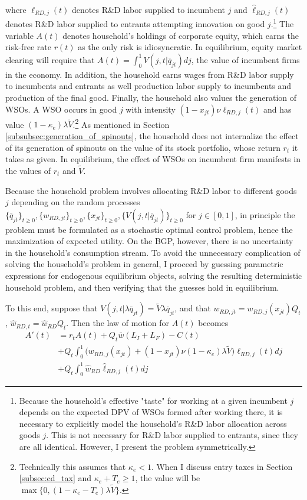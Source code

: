 \documentclass[11pt,english]{article}
\theoremstyle{remark}
\begin{document}
\normalsize


where $\ell_{RD,j}(t)$ denotes R\&D labor supplied to incumbent $j$ and $\hat{\ell}_{RD,j}(t)$ denotes R\&D labor supplied to entrants attempting innovation on good $j$.\footnote{Because the household's effective "taste" for working at a given incumbent $j$ depends on the expected DPV of WSOs formed after working there, it is necessary to explicitly model the household's R\&D labor allocation across goods $j$. This is not necessary for R\&D labor supplied to entrants, since they are all identical. However, I present the problem symmetrically.} The variable $A(t)$ denotes household's holdings of corporate equity, which earns the risk-free rate $r(t)$ as the only risk is idiosyncratic. In equilibrium, equity market clearing will require that $A(t) = \int_0^1 V(j,t|\bar{q}_{jt}) dj$, the value of incumbent firms in the economy. In addition, the household earns wages from R\&D labor supply to incumbents and entrants as well production labor supply to incumbents and production of the final good. Finally, the household also values the generation of WSOs. A WSO occurs in good $j$ with intensity $(1-x_{jt})\nu \ell_{RD,j}(t)$ and has value $(1-\kappa_e)\lambda \tilde{V}$.\footnote{Technically this assumes that $\kappa_e < 1$. When I discuss entry taxes in Section \ref{subsec:cd_tax} and $\kappa_e + T_e \ge 1$, the value will be $\max\{0,(1-\kappa_e - T_e) \lambda \tilde{V} \}$.} As mentioned in Section \ref{subsubsec:generation_of_spinouts}, the household does not internalize the effect of its generation of spinouts on the value of its stock portfolio, whose return $r_t$ it takes as given. In equilibrium, the effect of WSOs on incumbent firm manifests in the values of $r_t$ and $\tilde{V}$. 
	
Because the household problem involves allocating R\&D labor to different goods $j$ depending on the random processes $\{\bar{q}_{jt}\}_{t \ge 0}, \{w_{RD,jt}\}_{t\ge 0}, \{x_{jt}\}_{t\ge 0}, \{V(j,t|\bar{q}_{jt})\}_{t\ge 0}$ for $j \in [0,1]$, in principle the problem must be formulated as a stochastic optimal control problem, hence the maximization of expected utility. On the BGP, however, there is no uncertainty in the household's consumption stream. To avoid the unnecessary complication of solving the household's problem in general, I proceed by guessing parametric expressions for endogenous equilibrium objects, solving the resulting deterministic household problem, and then verifying that the guesses hold in equilibrium. 

To this end, suppose that $V(j,t|\lambda \bar{q}_{jt}) = \tilde{V} \lambda \bar{q}_{jt}$, and that $w_{RD,jt} = w_{RD,j}(x_{jt}) Q_t$,  $\hat{w}_{RD,t} = \hat{w}_{RD} Q_t$.  Then the law of motion for $A(t)$ becomes
\begin{align*}
	 A'(t) &= r_t A(t) + Q_t \bar{w} (L_I + L_F) - C(t) \\
		   &+ Q_t \int_0^1 \big( w_{RD,j}(x_{jt}) + (1-x_{jt}) \nu (1-\kappa_e) \lambda \tilde{V} \big) \ell_{RD,j}(t) dj \\
		   &+ Q_t \int_0^1 \hat{w}_{RD} \hat{\ell}_{RD,j}(t) dj
\end{align*}
\end{document}
